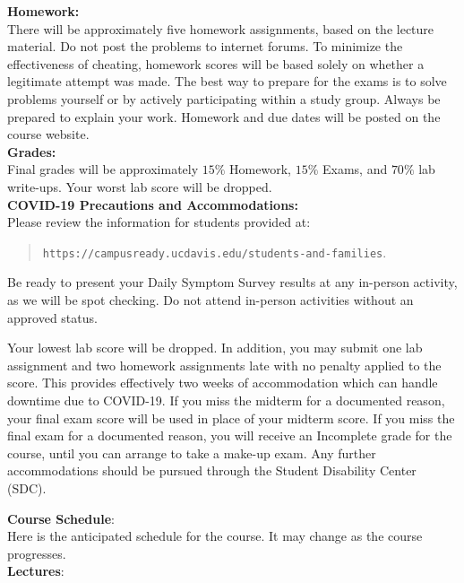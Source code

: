 \documentclass[12pt]{article}
\begin{document}
\noindent
\textbf{Homework:}\\
There will be approximately five homework assignments, based on the
lecture material.  Do not post the problems to internet forums.  To
minimize the effectiveness of cheating, homework scores will be based
solely on whether a legitimate attempt was made.  The best way to
prepare for the exams is to solve problems yourself or by actively
participating within a study group.  Always be prepared to explain
your work.  Homework and due dates will be posted on the course
website.\\

\noindent
\textbf {Grades:}\\
Final grades will be approximately $15\%$ Homework, $15\%$ Exams, and
$70\%$ lab write-ups.  Your worst lab score will be dropped.\\

\noindent
\textbf {COVID-19 Precautions and Accommodations:}\\
\noindent
Please review the information for students provided at:
\begin{quote}
{\tt https://campusready.ucdavis.edu/students-and-families}.
\end{quote}
Be ready to present your Daily Symptom Survey results at any in-person
activity, as we will be spot checking.  Do not attend in-person
activities without an approved status.

Your lowest lab score will be dropped.  In addition, you may submit
one lab assignment and two homework assignments late with no penalty
applied to the score.  This provides effectively two weeks of
accommodation which can handle downtime due to COVID-19.  If you miss
the midterm for a documented reason, your final exam score will be
used in place of your midterm score.  If you miss the final exam for a
documented reason, you will receive an Incomplete grade for the
course, until you can arrange to take a make-up exam.  Any further
accommodations should be pursued through the Student Disability Center
(SDC).

\newpage

\noindent
\textbf {Course Schedule}:\\
Here is the anticipated schedule for the course.  It may change as the
course progresses.\\

\noindent
\textbf {Lectures}:\\
\end{document}
